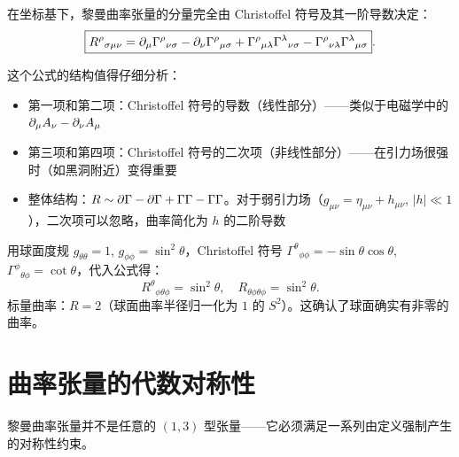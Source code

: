 \begin{property}
在坐标基下，黎曼曲率张量的分量完全由 Christoffel 符号及其一阶导数决定：
\begin{equation}
    \boxed{R^\rho{}_{\sigma\mu\nu} = \partial_\mu \Gamma^\rho{}_{\nu\sigma} - \partial_\nu \Gamma^\rho{}_{\mu\sigma} + \Gamma^\rho{}_{\mu\lambda}\Gamma^\lambda{}_{\nu\sigma} - \Gamma^\rho{}_{\nu\lambda}\Gamma^\lambda{}_{\mu\sigma}}.
\end{equation}
\end{property}

这个公式的结构值得仔细分析：
\begin{itemize}
    \item 第一项和第二项：Christoffel 符号的导数（线性部分）——类似于电磁学中的 $\partial_\mu A_\nu - \partial_\nu A_\mu$
    \item 第三项和第四项：Christoffel 符号的二次项（非线性部分）——在引力场很强时（如黑洞附近）变得重要
    \item 整体结构：$R \sim \partial\Gamma - \partial\Gamma + \Gamma\Gamma - \Gamma\Gamma$。对于弱引力场（$g_{\mu\nu} = \eta_{\mu\nu} + h_{\mu\nu}$, $|h| \ll 1$），二次项可以忽略，曲率简化为 $h$ 的二阶导数
\end{itemize}

用球面度规 $g_{\theta\theta} = 1$, $g_{\phi\phi} = \sin^2\theta$，Christoffel 符号 $\Gamma^\theta{}_{\phi\phi} = -\sin\theta\cos\theta$, $\Gamma^\phi{}_{\theta\phi} = \cot\theta$，代入公式得：
\begin{equation}
    R^\theta{}_{\phi\theta\phi} = \sin^2\theta, \quad R_{\theta\phi\theta\phi} = \sin^2\theta.
\end{equation}
标量曲率：$R = 2$（球面曲率半径归一化为 $1$ 的 $S^2$）。这确认了球面确实有非零的曲率。

\section{曲率张量的代数对称性}

黎曼曲率张量并不是任意的 $(1,3)$ 型张量——它必须满足一系列由定义强制产生的对称性约束。

